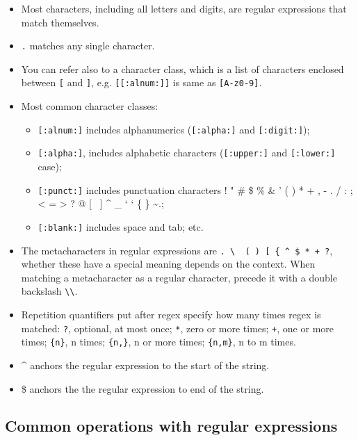 \documentclass[]{book}
\providecommand{\tightlist}{%
  \setlength{\itemsep}{0pt}\setlength{\parskip}{0pt}}
\begin{document}
\begin{itemize}
\tightlist
\item
  Most characters, including all letters and digits, are regular
  expressions that match themselves.
\item
  \texttt{.} matches any single character.
\item
  You can refer also to a character class, which is a list of characters
  enclosed between \texttt{{[}} and \texttt{{]}}, e.g.
  \texttt{{[}{[}:alnum:{]}{]}} is same as \texttt{{[}A-z0-9{]}}.
\item
  Most common character classes:

  \begin{itemize}
  \tightlist
  \item
    \texttt{{[}:alnum:{]}} includes alphanumerics
    (\texttt{{[}:alpha:{]}} and \texttt{{[}:digit:{]}});
  \item
    \texttt{{[}:alpha:{]}}, includes alphabetic characters
    (\texttt{{[}:upper:{]}} and \texttt{{[}:lower:{]}} case);
  \item
    \texttt{{[}:punct:{]}} includes punctuation characters ! " \# \$ \%
    \& ' ( ) * + , - . / : ; \textless{} = \textgreater{} ? @ {[} ~{]}
    \^{} \_ ` ` \{ \textbar{} \} \textasciitilde{}.;
  \item
    \texttt{{[}:blank:{]}} includes space and tab; etc.
  \end{itemize}
\item
  The metacharacters in regular expressions are
  \texttt{.\ \textbackslash{}\ \textbar{}\ (\ )\ {[}\ \{\ \^{}\ \$\ *\ +\ ?},
  whether these have a special meaning depends on the context. When
  matching a metacharacter as a regular character, precede it with a
  double backslash \texttt{\textbackslash{}\textbackslash{}}.
\item
  Repetition quantifiers put after regex specify how many times regex is
  matched: \texttt{?}, optional, at most once; \texttt{*}, zero or more
  times; \texttt{+}, one or more times; \texttt{\{n\}}, n times;
  \texttt{\{n,\}}, n or more times; \texttt{\{n,m\}}, n to m times.
\item
  \^{} anchors the regular expression to the start of the string.
\item
  \$ anchors the the regular expression to end of the string.
\end{itemize}

\subsection{Common operations with regular
expressions}\label{common-operations-with-regular-expressions}
\end{document}
